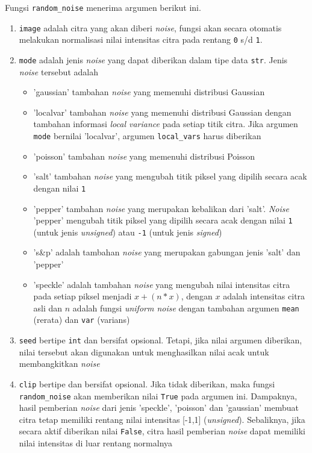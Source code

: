  Fungsi \texttt{random\_noise} menerima argumen berikut ini.
 \begin{enumerate}
   \item \texttt{image} adalah citra yang akan diberi \textit{noise}, fungsi akan secara otomatis melakukan normalisasi nilai intensitas citra pada rentang \texttt{0} s/d \texttt{1}.
   \item \texttt{mode} adalah jenis \textit{noise} yang dapat diberikan dalam tipe data \texttt{str}. Jenis \textit{noise} tersebut adalah
   \begin{itemize}
     \item 'gaussian' tambahan \textit{noise} yang memenuhi distribusi Gaussian
     \item 'localvar' tambahan \textit{noise} yang memenuhi distribusi Gaussian dengan tambahan informasi \textit{local variance} pada setiap titik citra. Jika argumen \texttt{mode} bernilai 'localvar', argumen \texttt{local\_vars} harus diberikan 
     \item 'poisson' tambahan \textit{noise} yang memenuhi distribusi Poisson
     \item 'salt' tambahan \textit{noise} yang mengubah titik piksel yang dipilih secara acak dengan nilai \texttt{1}
     \item 'pepper' tambahan \textit{noise} yang merupakan kebalikan dari 'salt'. \textit{Noise} 'pepper' mengubah titik piksel yang dipilih secara acak dengan nilai \texttt{1} (untuk jenis \textit{unsigned}) atau \texttt{-1} (untuk jenis \textit{signed})
     \item 's\&p' adalah tambahan \textit{noise} yang merupakan gabungan jenis 'salt' dan 'pepper'
     \item 'speckle' adalah tambahan \textit{noise} yang mengubah nilai intensitas citra pada setiap piksel menjadi $x+(n*x)$, dengan $x$ adalah intensitas citra asli dan $n$ adalah fungsi \textit{uniform noise} dengan tambahan argumen \texttt{mean} (rerata) dan \texttt{var} (varians) 
   \end{itemize}
   \item \texttt{seed} bertipe \texttt{int} dan bersifat opsional. Tetapi, jika nilai argumen diberikan, nilai tersebut akan digunakan untuk menghasilkan nilai acak untuk membangkitkan \textit{noise}
   \item \texttt{clip} bertipe  dan bersifat opsional. Jika tidak diberikan, maka fungsi \texttt{random\_noise} akan memberikan nilai \texttt{True} pada argumen ini. Dampaknya, hasil pemberian \textit{noise} dari jenis 'speckle', 'poisson' dan 'gaussian' membuat citra tetap memiliki rentang nilai intensitas [-1,1] (\textit{unsigned}). Sebaliknya, jika secara aktif diberikan nilai \texttt{False}, citra hasil pemberian \textit{noise} dapat memiliki nilai intensitas di luar rentang normalnya

\end{enumerate}
